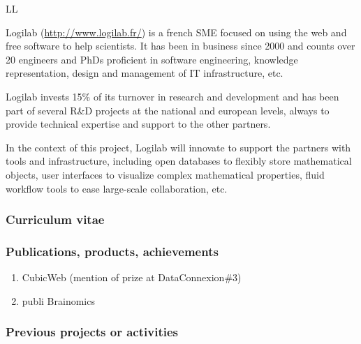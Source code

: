 \begin{sitedescription}{LL}

Logilab (\url{http://www.logilab.fr/}) is a french SME focused on using the web and free software to help
scientists. It has been in business since 2000 and counts over 20 engineers and
PhDs proficient in software engineering, knowledge representation, design and
management of IT infrastructure, etc.

Logilab invests 15\% of its turnover in research and development and has been
part of several R\&D projects at the national and european levels, always to
provide technical expertise and support to the other partners.

In the context of this project, Logilab will innovate to support the partners
with tools and infrastructure, including open databases to flexibly store
mathematical objects, user interfaces to visualize complex mathematical
properties, fluid workflow tools to ease large-scale collaboration, etc.



\item {}

\subsubsection*{Curriculum vitae}



%
%
%

\subsubsection*{Publications, products, achievements}

\begin{enumerate}
\item CubicWeb (mention of prize at DataConnexion\#3)
\item publi Brainomics
\end{enumerate}

\subsubsection*{Previous projects or activities}


\end{sitedescription}
